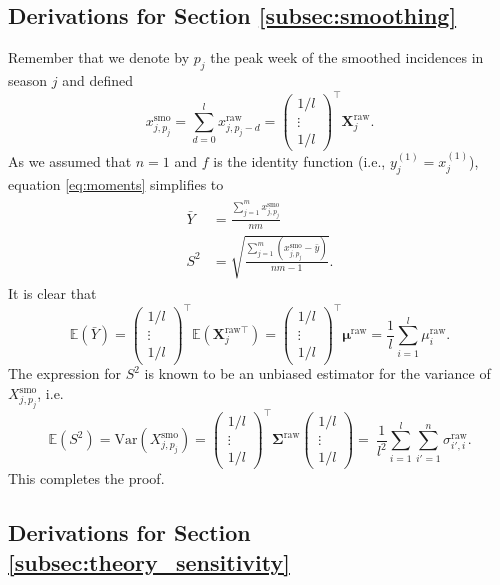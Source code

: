 \documentclass{article}
\begin{document}
\subsection{Derivations for Section \ref{subsec:smoothing}}

Remember that we denote by $p_j$ the peak week of the smoothed incidences in season $j$ and defined
$$
x^\text{smo}_{j, p_j} = \sum_{d = 0}^l x^\text{raw}_{j, p_j - d} = \begin{pmatrix} 1/l \\ \vdots \\ 1/l \end{pmatrix}^\top \mathbf{X}^{\text{raw}}_j.
$$
As we assumed that $n = 1$ and $f$ is the identity function (i.e., $y_j^{(1)} = x_j^{(1)}$), equation \eqref{eq:moments} simplifies to
\begin{align}
\begin{split}
\bar{Y} & = \frac{\sum_{j = 1}^m x_{j, p_j}^\text{smo}}{nm}\\
S^2 & = \sqrt{ \frac{\sum_{j = 1}^m (x_{j, p_j}^\text{smo}  - \bar{y})}{nm - 1}}.
\end{split}
\end{align}
It is clear that
$$
\mathbb{E}(\bar{Y}) = \begin{pmatrix} 1/l \\ \vdots \\ 1/l \end{pmatrix}^\top \mathbb{E}(\mathbf{X}^{\text{raw} \top}_j) = \begin{pmatrix} 1/l \\ \vdots \\ 1/l \end{pmatrix}^\top \boldsymbol{\mu}^\text{raw} = \frac{1}{l}\sum_{i = 1}^l \mu^\text{raw}_i.
$$
The expression for $S^2$ is known to be an unbiased estimator for the variance of $X_{j, p_j}^\text{smo}$, i.e.
$$
\mathbb{E}(S^2) = \text{Var}(X_{j, p_j}^\text{smo}) = \begin{pmatrix} 1/l \\ \vdots \\ 1/l \end{pmatrix}^\top \mathbf{\Sigma}^\text{raw} \begin{pmatrix} 1/l \\ \vdots \\ 1/l \end{pmatrix} = \ \frac{1}{l^2} \sum_{i = 1}^l \sum_{i' = 1}^n \sigma^\text{raw}_{i', i}.
$$
This completes the proof.

\subsection{Derivations for Section \ref{subsec:theory_sensitivity}}
\end{document}
